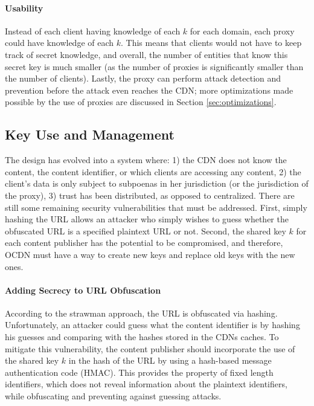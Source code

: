 \paragraph{Usability} Instead of each client having knowledge 
of each $k$ for each domain, each proxy could have knowledge of each $k$.  This means that clients would 
not have to keep track of secret knowledge, and overall, the number of entities that know this secret key 
is much smaller (as the number of proxies is significantly smaller than the number of clients).  Lastly, 
the proxy can perform attack detection and prevention before the attack even reaches the CDN; more optimizations 
made possible by the use of proxies are discussed in Section \ref{sec:optimizations}.

\subsection{Key Use and Management}
\label{sec:keys}
The design has evolved into a system where: 1) the CDN does not know the content, the content identifier, 
or which clients are accessing any content, 2) the client's data is only subject to subpoenas in her jurisdiction 
(or the jurisdiction of the proxy), 3) trust has been distributed, as opposed to centralized.  There are still 
some remaining security vulnerabilities that must be addressed.  First, simply hashing the URL allows an attacker who simply 
wishes to guess whether the obfuscated URL is a specified plaintext URL or not.  Second, the shared key $k$ for each content 
publisher has the potential to be compromised, and therefore, OCDN must have a way to create new keys and replace 
old keys with the new ones.

\paragraph{Adding Secrecy to URL Obfuscation} According to the strawman approach, the URL is obfuscated via hashing.  Unfortunately, 
an attacker could guess what the content identifier is by hashing his guesses and comparing with the hashes stored in the 
CDNs caches.  To mitigate this vulnerability, the content publisher should incorporate the use of the shared key $k$ in the 
hash of the URL by using a hash-based message authentication code (HMAC).  This provides the property of fixed length 
identifiers, which does not reveal information about the plaintext identifiers, while obfuscating and preventing 
against guessing attacks.  

